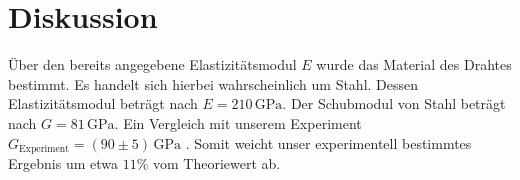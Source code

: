 \section{Diskussion}
\label{sec:Diskussion}
Über den bereits angegebene Elastizitätsmodul $E$ wurde das Material des Drahtes bestimmt.
Es handelt sich hierbei wahrscheinlich um Stahl. Dessen Elastizitätsmodul beträgt nach \cite{stahlharteJungs} $E=210 \,\si{\giga\pascal}$.
Der Schubmodul von Stahl beträgt nach \cite{stahlharteJungs} $G=81 \,\si{\giga\pascal}$. Ein Vergleich mit unserem Experiment $G_{\mathrm{Experiment}}=(90 \pm 5) \,\si{\giga\pascal}$ .
Somit weicht unser experimentell bestimmtes Ergebnis um etwa $11\%$ vom Theoriewert ab.
